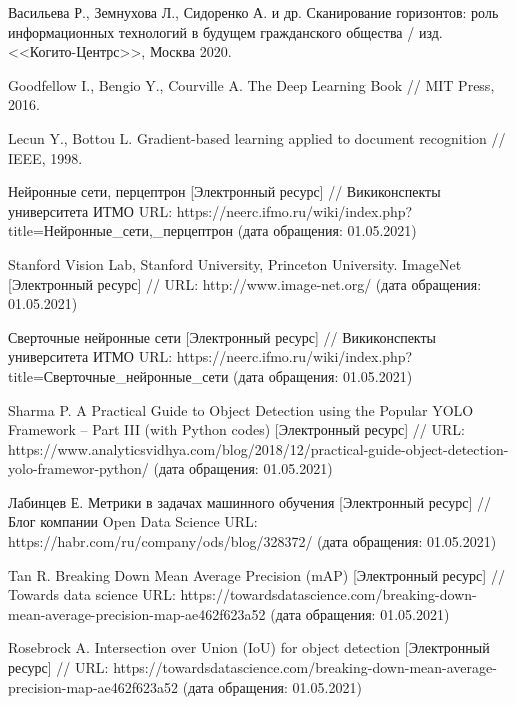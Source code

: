 \begingroup 
\renewcommand{\section}[2]{\anonsection{Библиографический список}}
\begin{thebibliography}{00}

    Васильева Р., Земнухова Л., Сидоренко А. и др.
    Сканирование горизонтов: роль информационных технологий в будущем гражданского общества /
    изд. <<Когито-Центрс>>, Москва 2020.

    Goodfellow I., Bengio Y., Courville A.
    The Deep Learning Book //
    MIT Press, 2016.

    Lecun Y., Bottou L.
    Gradient-based learning applied to document recognition //
    IEEE, 1998.

    Нейронные сети, перцептрон
    [Электронный ресурс] //
    Викиконспекты университета ИТМО
    URL: https://neerc.ifmo.ru/wiki/index.php?title=Нейронные\_сети,\_перцептрон
    (дата обращения: 01.05.2021)

    Stanford  Vision  Lab,  Stanford  University,  Princeton  University.  ImageNet 
    [Электронный ресурс] //
    URL: http://www.image-net.org/
    (дата обращения: 01.05.2021)

    Сверточные нейронные сети
    [Электронный ресурс] //
    Викиконспекты университета ИТМО
    URL: https://neerc.ifmo.ru/wiki/index.php?title=Сверточные\_нейронные\_сети
    (дата обращения: 01.05.2021)

    Sharma  P.  A  Practical  Guide  to  Object  Detection  using  the  Popular YOLO Framework – Part  III  (with  Python  codes)
    [Электронный ресурс] //
    URL: https://www.analyticsvidhya.com/blog/2018/12/practical-guide-object-detection-yolo-framewor-python/
    (дата обращения: 01.05.2021)

    Лабинцев  Е.  Метрики в задачах машинного обучения
    [Электронный ресурс] //
    Блог компании Open Data Science
    URL: https://habr.com/ru/company/ods/blog/328372/
    (дата обращения: 01.05.2021)

    Tan R. Breaking Down Mean Average Precision (mAP)
    [Электронный ресурс] //
    Towards data science
    URL: https://towardsdatascience.com/breaking-down-mean-average-precision-map-ae462f623a52
    (дата обращения: 01.05.2021)

    Rosebrock A. Intersection over Union (IoU) for object detection
    [Электронный ресурс] //
    URL: https://towardsdatascience.com/breaking-down-mean-average-precision-map-ae462f623a52
    (дата обращения: 01.05.2021)

\end{thebibliography}
\endgroup

\clearpage